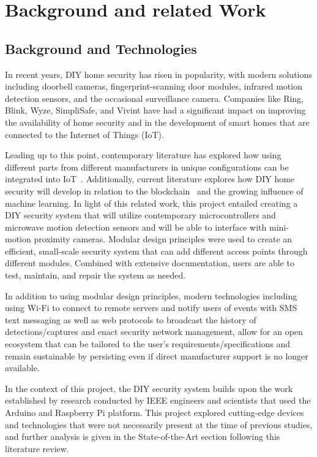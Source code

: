 \section{Background and related Work}\label{sec:background-and-related-work}

\subsection{Background and Technologies}\label{subsec:background-and-technologies}

In recent years, DIY home security has risen in popularity, with modern solutions including
doorbell cameras, fingerprint-scanning door modules, infrared motion detection sensors, and
the occasional surveillance camera. %
Companies like Ring, Blink, Wyze, SimpliSafe, and Vivint have had a significant
impact on improving the availability of home security and in the
development of smart homes that are connected to the Internet of Things (IoT). %

Leading up to this point, contemporary literature has explored how using different parts
from different manufacturers in unique configurations can be integrated into
IoT~\cite{sarhan2020}. %
Additionally, current literature explores how DIY home security will develop in relation to
the blockchain~\cite{arifEtAl_2020} and the growing influence
of machine learning\cite{khanEtAl2021}. %
In light of this related work, this project entailed creating a DIY security system that
will utilize contemporary microcontrollers and microwave motion detection sensors and
will be able to interface with mini-motion proximity cameras. %
Modular design principles were used to create an efficient, small-scale security system that can add different access
points through different modules. %
Combined with extensive documentation, users are able to test, maintain, and repair the system as needed. %

In addition to using modular design principles, modern technologies including using Wi-Fi
to connect to remote servers and notify users of events with SMS text messaging as well
as web protocols to broadcast the history of detections/captures and enact security
network management, allow for an open ecosystem that can be tailored to the user’s
requirements/specifications and remain sustainable by persisting even if direct
manufacturer support is no longer available. %

In the context of this project, the DIY security system builds upon the work established
by research conducted by IEEE engineers and scientists that used the Arduino and
Raspberry Pi platform. %
This project explored cutting-edge devices and technologies that were not
necessarily present at the time of previous studies, and further analysis
is given in the State-of-the-Art section following this literature review. %


